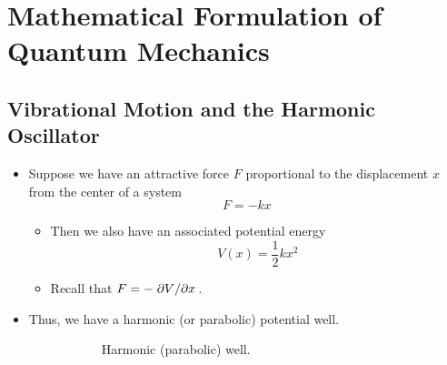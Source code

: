 \documentclass[../notes.tex]{subfiles}
\begin{document}
\chapter{Mathematical Formulation of Quantum Mechanics}
\section{Vibrational Motion and the Harmonic Oscillator}
\begin{itemize}
    \item {}Suppose we have an attractive force $F$ proportional to the displacement $x$ from the center of a system
    \begin{equation*}
        F = -kx
    \end{equation*}
    \begin{itemize}
        \item Then we also have an associated potential energy
        \begin{equation*}
            V(x) = \frac{1}{2}kx^2
        \end{equation*}
        \item Recall that $F=-\pdv*{V}{x}$.
    \end{itemize}
    \item Thus, we have a harmonic (or parabolic) potential well.
    \begin{figure}[h!]
        \centering
        \begin{subfigure}[b]{0.4\linewidth}
            \centering
            \caption{Harmonic (parabolic) well.}
            \label{fig:parabolicPotentiala}
        \end{subfigure}
        \begin{subfigure}[b]{0.4\linewidth}
            \centering
\end{subfigure}
\end{figure}
\end{itemize}
\end{document}
